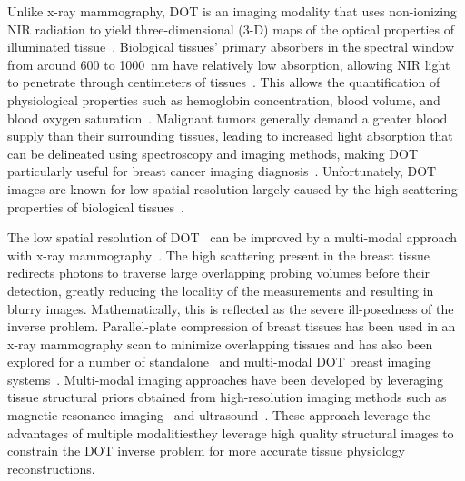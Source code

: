 Unlike x-ray mammography, \ac{DOT} is an imaging modality that uses non-ionizing \ac{NIR} radiation to yield three-dimensional (3-D) maps of the optical properties of illuminated tissue~\cite{Boas2001, Dehghani2009, Yamada2014, Hoshi2016}. Biological tissues' primary absorbers in the spectral window from around 600 to 1000~nm have relatively low absorption, allowing \ac{NIR} light to penetrate through centimeters of tissues~\cite{Gibson2005}. This allows the quantification of physiological properties such as hemoglobin concentration, blood volume, and blood oxygen saturation~\cite{Leff2008, Boas2001}. Malignant tumors generally demand a greater blood supply than their surrounding tissues, leading to increased light absorption that can be delineated using spectroscopy and imaging methods, making \ac{DOT} particularly useful for breast cancer imaging diagnosis~\cite{Wang2022, Vavadi2014, Flexman2013, Choe2009, Taroni2005}. Unfortunately, \ac{DOT} images are known for low spatial resolution largely caused by the high scattering properties of biological tissues~\cite{Boas2001}. 

The low spatial resolution of \ac{DOT}~\cite{Li2010} can be improved by a multi-modal approach with x-ray mammography~\cite{Zimmermann2017, Deng2015, Deng2015a, Fang2009a}. The high scattering present in the breast tissue redirects photons to traverse large overlapping probing volumes before their detection, greatly reducing the locality of the measurements and resulting in blurry images. Mathematically, this is reflected as the severe ill-posedness of the inverse problem. Parallel-plate compression of breast tissues has been used in an x-ray mammography scan to minimize overlapping tissues and has also been explored for a number of standalone~\cite{Choe2009, Culver2003} and multi-modal \ac{DOT} breast imaging systems~\cite{ZhuReview2020, Fang2009a, Krishnaswamy2012}. Multi-modal imaging approaches have been developed by leveraging tissue structural priors obtained from high-resolution imaging methods such as magnetic resonance imaging~\cite{Ghussein2013,Ntziachristos2002} and ultrasound~\cite{Zhu2010}. These approach leverage the advantages of multiple modalities\textemdash they leverage high quality structural images to constrain the \ac{DOT} inverse problem for more accurate tissue physiology reconstructions. 

